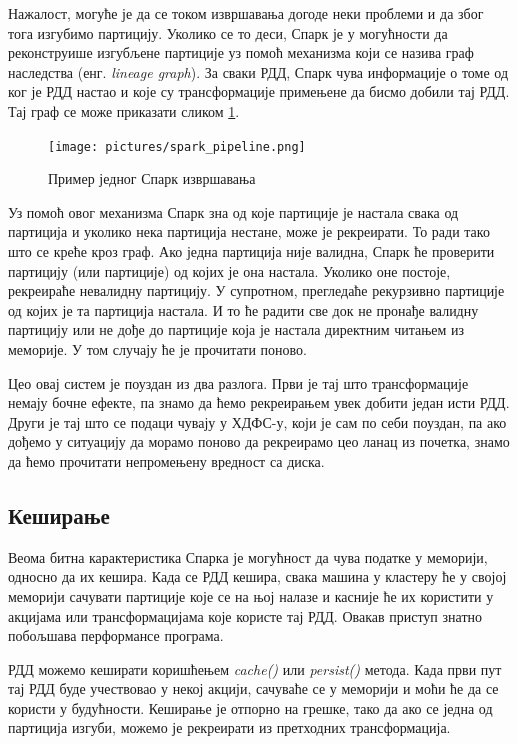 \documentclass[12pt,oneside]{memoir}
\begin{document}
Нажалост, могуће је да се током извршавања догоде неки проблеми и да због тога изгубимо партицију. Уколико се то деси, Спарк је у могућности да реконструише изгубљене партиције уз помоћ механизма који се назива граф наследства (енг. \textit{lineage graph}). За сваки РДД, Спарк чува информације о томе од ког је РДД настао и које су трансформације примењене да бисмо добили тај РДД. Тај граф се може приказати сликом \ref{fig:sprk_ppln}.

\begin{figure}[!ht]
  \centering
  \texttt{[image: pictures/spark\_pipeline.png]}
  \caption{Пример једног Спарк извршавања}
  \label{fig:sprk_ppln}
\end{figure}

Уз помоћ овог механизма Спарк зна од које партиције је настала свака од партиција и уколико нека партиција нестане, може је рекреирати. То ради тако што се креће кроз граф. Ако једна партиција није валидна, Спарк ће проверити партицију (или партиције) од којих је она настала. Уколико оне постоје, рекреираће невалидну партицију. У супротном, прегледаће рекурзивно партиције од којих је та партиција настала. И то ће радити све док не пронађе валидну партицију или не дође до партиције која је настала директним читањем из меморије. У том случају ће је прочитати поново. \cite{hadoop_learning}

Цео овај систем је поуздан из два разлога. Први је тај што трансформације немају бочне ефекте, па знамо да ћемо рекреирањем увек добити један исти РДД. Други је тај што се подаци чувају у ХДФС-у, који је сам по себи поуздан, па ако дођемо у ситуацију да морамо поново да рекреирамо цео ланац из почетка, знамо да ћемо прочитати непромењену вредност са диска.

\subsection{Кеширање}
\label{subsec:spark_persist}

Веома битна карактеристика Спарка је могућност да чува податке у меморији, односно да их кешира. Када се РДД кешира, свака машина у кластеру ће у својој меморији сачувати партиције које се на њој налазе и касније ће их користити у акцијама или трансформацијама које користе тај РДД. Овакав приступ знатно побољшава перформансе програма. \cite{spark_rdd}

РДД можемо кеширати коришћењем \textit{cache()} или \textit{persist()} метода. Када први пут тај РДД буде учествовао у некој акцији, сачуваће се у меморији и моћи ће да се користи у будућности. Кеширање је отпорно на грешке, тако да ако се једна од партиција изгуби, можемо је рекреирати из претходних трансформација. \cite{spark_rdd}
\end{document}
